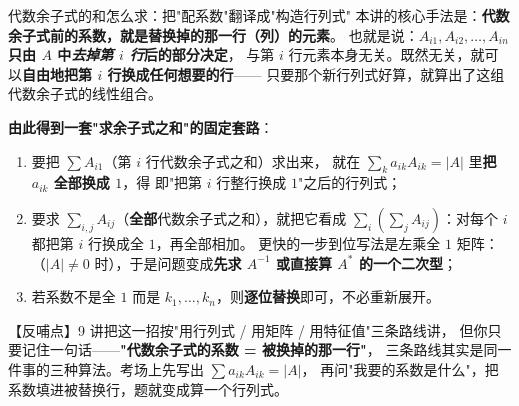 \begin{fdeep}{代数余子式的和怎么求：把"配系数"翻译成"构造行列式"}
本讲的核心手法是：\textbf{代数余子式前的系数，就是替换掉的那一行（列）的元素}。
也就是说：\textbf{$A_{i1},A_{i2},\dots,A_{in}$ 只由 $A$ 中\emph{去掉第 $i$ 行}后的部分决定}，
与第 $i$ 行元素本身无关。既然无关，就可以\textbf{自由地把第 $i$ 行换成任何想要的行}——
只要那个新行列式好算，就算出了这组代数余子式的线性组合。

\medskip
\textbf{由此得到一套"求余子式之和"的固定套路}：
\begin{enumerate}[leftmargin=2.2em,itemsep=0.25em]
\item 要把 $\sum A_{i1}$（第 $i$ 行代数余子式之和）求出来，
      就在 $\sum_k a_{ik}A_{ik}=|A|$ 里\textbf{把 $a_{ik}$ 全部换成 $1$}，得
      即"把第 $i$ 行整行换成 $1$"之后的行列式；
\item 要求 $\sum_{i,j}A_{ij}$（\textbf{全部}代数余子式之和），就把它看成
      $\sum_i\left(\sum_j A_{ij}\right)$：对每个 $i$ 都把第 $i$ 行换成全 $1$，再全部相加。
      更快的一步到位写法是左乘全 $1$ 矩阵：
      （$|A|\ne0$ 时），于是问题变成\textbf{先求 $A^{-1}$ 或直接算 $A^{*}$ 的一个二次型}；
\item 若系数不是全 $1$ 而是 $k_1,\dots,k_n$，则\textbf{逐位替换}即可，不必重新展开。
\end{enumerate}
【反哺点】9 讲把这一招按"用行列式 / 用矩阵 / 用特征值"三条路线讲，
但你只要记住一句话——\textbf{"代数余子式的系数 = 被换掉的那一行"}，
三条路线其实是同一件事的三种算法。考场上先写出 $\sum a_{ik}A_{ik}=|A|$，
再问"我要的系数是什么"，把系数填进被替换行，题就变成算一个行列式。
\end{fdeep}

